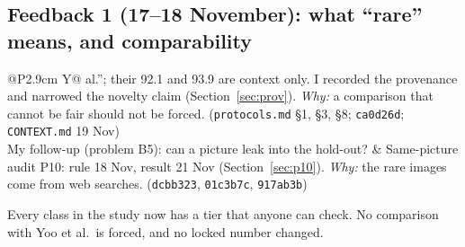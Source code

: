 \documentclass[10pt,a4paper]{article}
\newcommand{\file}[1]{\texttt{\small #1}}
\newcommand{\hash}[1]{\texttt{\footnotesize #1}}
\newenvironment{parts}{\begin{description}[style=unboxed, leftmargin=0pt, itemsep=3pt, font=\normalfont\bfseries\itshape]}{\end{description}}
\newenvironment{topic}[2]{\subsection{#1}\label{#2}\begin{parts}}{\end{parts}}
\begin{document}
\begin{topic}{Feedback 1 (17--18 November): what ``rare'' means, and comparability}{sec:fb1}
{\begin{tabularx}{\linewidth}{@{}P{2.9cm} Y@{}}
al.''; their 92.1 and 93.9 are context only. I recorded the provenance and narrowed the novelty claim
(Section~\ref{sec:prov}). \emph{Why:} a comparison that cannot be fair should not be forced.
(\file{protocols.md} \S1, \S3, \S8; \hash{ca0d26d}; \file{CONTEXT.md} 19 Nov) \\
My follow-up (problem B5): can a picture leak into the hold-out? &
Same-picture audit P10: rule 18 Nov, result 21 Nov (Section~\ref{sec:p10}). \emph{Why:} the rare images come
from web searches. (\hash{dcbb323}, \hash{01c3b7c}, \hash{917ab3b}) \\
\bottomrule
\end{tabularx}}

\item[Result.] Every class in the study now has a tier that anyone can check. No comparison with Yoo et al.\ is
forced, and no locked number changed.
\end{topic}
\end{document}
